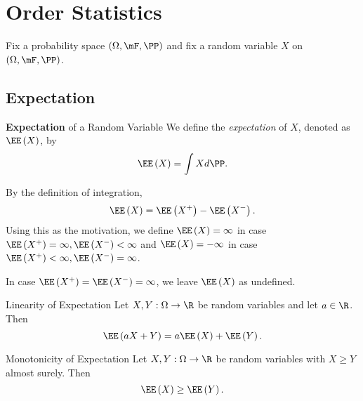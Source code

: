 \documentclass[stat901]{subfiles}
\begin{document}
    \section{Order Statistics}

    Fix a probability space $\left( \Omega,\mF,\PP \right)$ and fix a random variable $X$ on $\left( \Omega,\mF,\PP \right)$.
    
    \subsection{Expectation}

    \begin{definition}{\textbf{Expectation} of a Random Variable}
        We define the \emph{expectation} of $X$, denoted as $\EE\left( X \right)$, by
        \begin{equation*}
            \EE\left( X \right) = \int Xd\PP.
        \end{equation*}
    \end{definition}

    \np By the definition of integration,
    \begin{equation*}
        \EE\left( X \right) = \EE\left( X^+ \right) - \EE\left( X^- \right).
    \end{equation*}
    Using this as the motivation, we define $\EE\left( X \right) = \infty$ in case $\EE\left( X^+ \right)=\infty, \EE\left( X^- \right)<\infty$ and $\EE\left( X \right) = -\infty$ in case $\EE\left( X^+ \right)<\infty, \EE\left( X^- \right)=\infty$.

    In case $\EE\left( X^+ \right)=\EE\left( X^- \right)=\infty$, we leave $\EE\left( X \right)$ as undefined.
    
    \begin{prop}{Linearity of Expectation}
        Let $X,Y:\Omega\to\R$ be random variables and let $a\in\R$. Then
        \begin{equation*}
            \EE\left( aX+Y \right) = a\EE\left( X \right) + \EE\left( Y \right).
        \end{equation*}
    \end{prop}

    \rruleline

    \begin{prop}{Monotonicity of Expectation}
        Let $X,Y:\Omega\to\R$ be random variables with $X\geq Y$ almost surely. Then
        \begin{equation*}
            \EE\left( X \right)\geq\EE\left( Y \right).
        \end{equation*}
    \end{prop}
\end{document}
